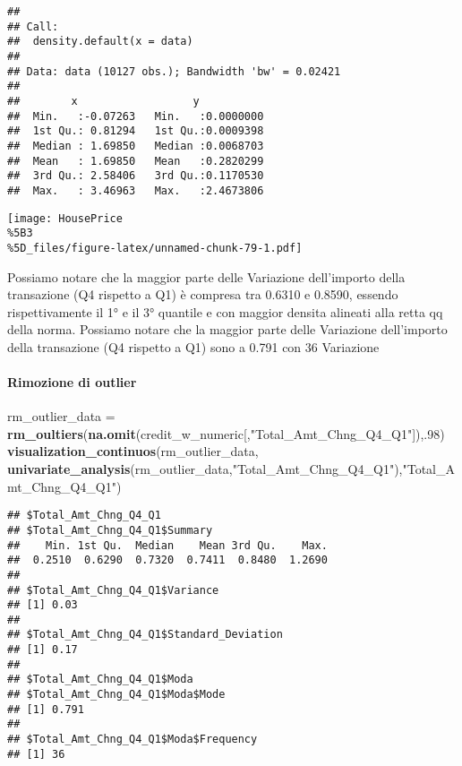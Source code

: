\documentclass[
]{article}
\newenvironment{Shaded}{\begin{snugshade}}{\end{snugshade}}
\newcommand{\DecValTok}[1]{\textcolor[rgb]{0.00,0.00,0.81}{#1}}
\newcommand{\FunctionTok}[1]{\textcolor[rgb]{0.13,0.29,0.53}{\textbf{#1}}}
\newcommand{\NormalTok}[1]{#1}
\newcommand{\OtherTok}[1]{\textcolor[rgb]{0.56,0.35,0.01}{#1}}
\newcommand{\StringTok}[1]{\textcolor[rgb]{0.31,0.60,0.02}{#1}}
\begin{document}
\begin{verbatim}
## 
## Call:
##  density.default(x = data)
## 
## Data: data (10127 obs.); Bandwidth 'bw' = 0.02421
## 
##        x                  y            
##  Min.   :-0.07263   Min.   :0.0000000  
##  1st Qu.: 0.81294   1st Qu.:0.0009398  
##  Median : 1.69850   Median :0.0068703  
##  Mean   : 1.69850   Mean   :0.2820299  
##  3rd Qu.: 2.58406   3rd Qu.:0.1170530  
##  Max.   : 3.46963   Max.   :2.4673806
\end{verbatim}

\texttt{[image: HousePrice\\\%5B3\\\%5D\_files/figure-latex/unnamed-chunk-79-1.pdf]}

Possiamo notare che la maggior parte delle Variazione dell'importo della
transazione (Q4 rispetto a Q1) è compresa tra 0.6310 e 0.8590, essendo
rispettivamente il 1° e il 3° quantile e con maggior densita alineati
alla retta qq della norma. Possiamo notare che la maggior parte delle
Variazione dell'importo della transazione (Q4 rispetto a Q1) sono a
0.791 con 36 Variazione

\paragraph{Rimozione di outlier}\label{rimozione-di-outlier-15}

\begin{Shaded}
\begin{Highlighting}[]
\NormalTok{rm\_outlier\_data }\OtherTok{=} \FunctionTok{rm\_oultiers}\NormalTok{(}\FunctionTok{na.omit}\NormalTok{(credit\_w\_numeric[,}\StringTok{"Total\_Amt\_Chng\_Q4\_Q1"}\NormalTok{]),.}\DecValTok{98}\NormalTok{)}
\FunctionTok{visualization\_continuos}\NormalTok{(rm\_outlier\_data, }\FunctionTok{univariate\_analysis}\NormalTok{(rm\_outlier\_data,}\StringTok{"Total\_Amt\_Chng\_Q4\_Q1"}\NormalTok{),}\StringTok{"Total\_Amt\_Chng\_Q4\_Q1"}\NormalTok{)}
\end{Highlighting}
\end{Shaded}

\begin{verbatim}
## $Total_Amt_Chng_Q4_Q1
## $Total_Amt_Chng_Q4_Q1$Summary
##    Min. 1st Qu.  Median    Mean 3rd Qu.    Max. 
##  0.2510  0.6290  0.7320  0.7411  0.8480  1.2690 
## 
## $Total_Amt_Chng_Q4_Q1$Variance
## [1] 0.03
## 
## $Total_Amt_Chng_Q4_Q1$Standard_Deviation
## [1] 0.17
## 
## $Total_Amt_Chng_Q4_Q1$Moda
## $Total_Amt_Chng_Q4_Q1$Moda$Mode
## [1] 0.791
## 
## $Total_Amt_Chng_Q4_Q1$Moda$Frequency
## [1] 36
\end{verbatim}
\end{document}

